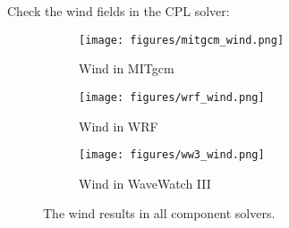 
Check the wind fields in the CPL solver:

\begin{figure}[h!]
\centering
  \begin{subfigure}[b]{0.3\linewidth}
  \texttt{[image: figures/mitgcm\_wind.png]}
  \caption{Wind in MITgcm}
  \end{subfigure}
  \begin{subfigure}[b]{0.3\linewidth}
  \texttt{[image: figures/wrf\_wind.png]}
  \caption{Wind in WRF}
  \end{subfigure}
  \begin{subfigure}[b]{0.3\linewidth}
  \texttt{[image: figures/ww3\_wind.png]}
  \caption{Wind in WaveWatch III}
  \end{subfigure}
\caption{The wind results in all component solvers.}
\label{fig:wind}
\end{figure}
